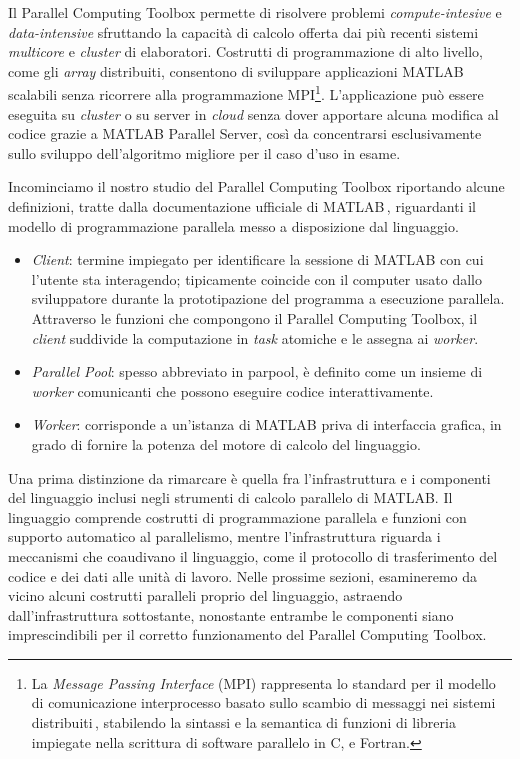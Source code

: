 \nocite{MathWorksParallelComputing}
Il Parallel Computing Toolbox permette di risolvere problemi \textit{compute-intesive} e  \textit{data-intensive} sfruttando 
la capacit\`a di calcolo offerta dai pi\`u recenti sistemi \textit{multicore} e \textit{cluster} di elaboratori. \newline
Costrutti di programmazione di alto livello, come gli \textit{array} distribuiti, consentono di sviluppare applicazioni MATLAB scalabili senza ricorrere alla programmazione 
MPI\footnote{La \textit{Message Passing Interface} (MPI) rappresenta lo standard per il modello di comunicazione interprocesso basato sullo scambio 
di messaggi nei sistemi distribuiti\,\cite{NMSUMPIIntro}, stabilendo la sintassi e la semantica di funzioni di libreria impiegate nella scrittura di software parallelo in C, \CC e Fortran.}.\newline
L'applicazione pu\`o essere eseguita su \textit{cluster} o su server in \textit{cloud} senza dover apportare alcuna modifica al codice grazie a MATLAB 
Parallel Server, cos\`i da concentrarsi esclusivamente sullo sviluppo dell'algoritmo migliore per il caso d'uso in esame.

Incominciamo il nostro studio del Parallel Computing Toolbox riportando alcune definizioni, tratte dalla documentazione ufficiale di MATLAB\,\cite{MathWorksWhatIsParallel}, riguardanti il modello di programmazione parallela messo a disposizione dal linguaggio.
\begin{itemize}
\item \textit{Client}: termine impiegato per identificare la sessione di MATLAB con cui l'utente sta interagendo; tipicamente coincide con il 
computer usato dallo sviluppatore durante la prototipazione del programma a esecuzione parallela.\newline
Attraverso le funzioni che compongono il Parallel Computing Toolbox, il \textit{client} suddivide la computazione in \textit{task} atomiche e le assegna ai \textit{worker}.
\item \textit{Parallel Pool}: spesso abbreviato in parpool, \`e definito come un insieme di \textit{worker} comunicanti che possono eseguire codice interattivamente.
\item \textit{Worker}: corrisponde a un'istanza di MATLAB priva di interfaccia grafica, in grado di fornire la potenza del 
motore di calcolo del linguaggio.
\end{itemize}

Una prima distinzione da rimarcare \`e quella fra l'infrastruttura e i componenti del linguaggio inclusi negli strumenti di calcolo parallelo di MATLAB.\newline 
Il linguaggio comprende costrutti di programmazione parallela e funzioni con supporto automatico al parallelismo, mentre l'infrastruttura riguarda i meccanismi che coaudivano il linguaggio, come il protocollo di trasferimento del codice e dei dati alle unit\`a di lavoro. \newline
Nelle prossime sezioni, esamineremo da vicino alcuni costrutti paralleli proprio del linguaggio, astraendo dall'infrastruttura sottostante, nonostante entrambe le componenti 
siano imprescindibili per il corretto funzionamento del Parallel Computing Toolbox.

